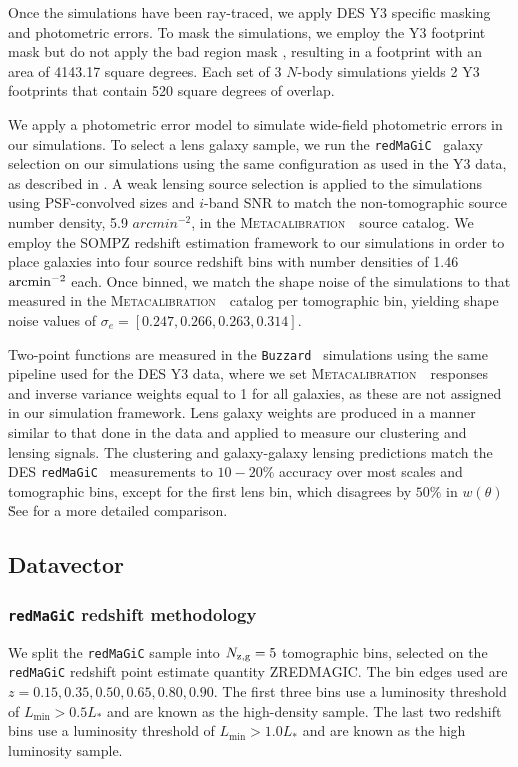 \documentclass[fleqn,usenatbib]{mnras}
\newcommand{\wtheta}{\ensuremath{w(\theta)}}
\newcommand{\redmagic}{\texttt{redMaGiC} }
\newcommand{\buzzard}{\texttt{Buzzard} }
\newcommand{\metacal}{{\textsc{Metacalibration}~}}
\begin{document}
Once the simulations have been ray-traced, we apply DES Y3 specific masking and photometric errors. To mask the simulations, we employ the Y3 footprint mask but do not apply the bad region mask \citep{y3-gold}, resulting in a footprint with an area of 4143.17 square degrees. Each set of 3 $N$-body simulations yields 2 Y3 footprints that contain 520 square degrees of overlap.

We apply a photometric error model to simulate wide-field photometric errors in our simulations. To select a lens galaxy sample, we run the \redmagic\ galaxy selection on our simulations using the same configuration as used in the Y3 data, as described in \citet{y3-galaxyclustering}. A weak lensing source selection is applied to the simulations using PSF-convolved sizes and $i$-band SNR to match the non-tomographic source number density, 5.9 $arcmin^{-2}$, in the \metacal\ source catalog. We employ the SOMPZ redshift estimation framework to our simulations in order to place galaxies into four source redshift bins with number densities of 1.46 $\rm arcmin^{-2}$ each. Once binned, we match the shape noise of the simulations to that measured in the \metacal\ catalog per tomographic bin, yielding shape noise values of $\sigma_{e}=[0.247, 0.266, 0.263, 0.314]$.

Two-point functions are measured in the \buzzard\ simulations using the same pipeline used for the DES Y3 data, where we set \metacal\ responses and inverse variance weights equal to 1 for all galaxies, as these are not assigned in our simulation framework. Lens galaxy weights are produced in a manner similar to that done in the data and applied to measure our clustering and lensing signals. The clustering and galaxy-galaxy lensing predictions match the DES \redmagic\ measurements to $10-20\%$ accuracy over most scales and tomographic bins, except for the first lens bin, which disagrees by $50\%$ in \wtheta\. See \citet{y3-simvalidation} for a more detailed comparison.

\subsection{Datavector}

\subsubsection{\redmagic redshift methodology}
\label{sec:lensz}
We split the \redmagic sample into $N_{\rm z,g} = 5$ tomographic bins, selected on the \redmagic redshift point estimate quantity ZREDMAGIC. The bin edges used are $z=0.15, 0.35, 0.50, 0.65, 0.80, 0.90$. The first three bins use a luminosity threshold of $L_{\min} > 0.5 L_{*}$ and are known as the high-density sample. The last two redshift bins use a luminosity threshold of $L_{\min} > 1.0 L_{*}$ and are known as the high luminosity sample.
\end{document}
